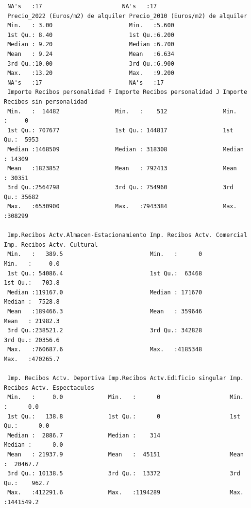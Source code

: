 \documentclass[notspecified,article,submit,moreauthors,pdftex]{Definitions/mdpi}
\begin{document}
\begin{verbatim}
 NA's   :17                       NA's   :17                      
 Precio_2022 (Euros/m2) de alquiler Precio_2010 (Euros/m2) de alquiler
 Min.   : 3.00                      Min.   :5.600                     
 1st Qu.: 8.40                      1st Qu.:6.200                     
 Median : 9.20                      Median :6.700                     
 Mean   : 9.24                      Mean   :6.634                     
 3rd Qu.:10.00                      3rd Qu.:6.900                     
 Max.   :13.20                      Max.   :9.200                     
 NA's   :17                         NA's   :17                        
 Importe Recibos personalidad F Importe Recibos personalidad J Importe Recibos sin personalidad
 Min.   :  14482                Min.   :    512                Min.   :     0                  
 1st Qu.: 707677                1st Qu.: 144817                1st Qu.:  5953                  
 Median :1468509                Median : 318308                Median : 14309                  
 Mean   :1823852                Mean   : 792413                Mean   : 30351                  
 3rd Qu.:2564798                3rd Qu.: 754960                3rd Qu.: 35682                  
 Max.   :6530900                Max.   :7943384                Max.   :308299                  
                                                                                               
 Imp.Recibos Actv.Almacen-Estacionamiento Imp. Recibos Actv. Comercial Imp. Recibos Actv. Cultural
 Min.   :   389.5                         Min.   :      0              Min.   :     0.0           
 1st Qu.: 54086.4                         1st Qu.:  63468              1st Qu.:   703.8           
 Median :119167.0                         Median : 171670              Median :  7528.8           
 Mean   :189466.3                         Mean   : 359646              Mean   : 21982.3           
 3rd Qu.:238521.2                         3rd Qu.: 342828              3rd Qu.: 20356.6           
 Max.   :760687.6                         Max.   :4185348              Max.   :470265.7           
                                                                                                  
 Imp. Recibos Actv. Deportiva Imp.Recibos Actv.Edificio singular Imp. Recibos Actv. Espectaculos
 Min.   :     0.0             Min.   :      0                    Min.   :      0.0              
 1st Qu.:   138.8             1st Qu.:      0                    1st Qu.:      0.0              
 Median :  2886.7             Median :    314                    Median :      0.0              
 Mean   : 21937.9             Mean   :  45151                    Mean   :  20467.7              
 3rd Qu.: 10138.5             3rd Qu.:  13372                    3rd Qu.:    962.7              
 Max.   :412291.6             Max.   :1194289                    Max.   :1441549.2              
                                                                                                

\end{verbatim}
\end{document}
